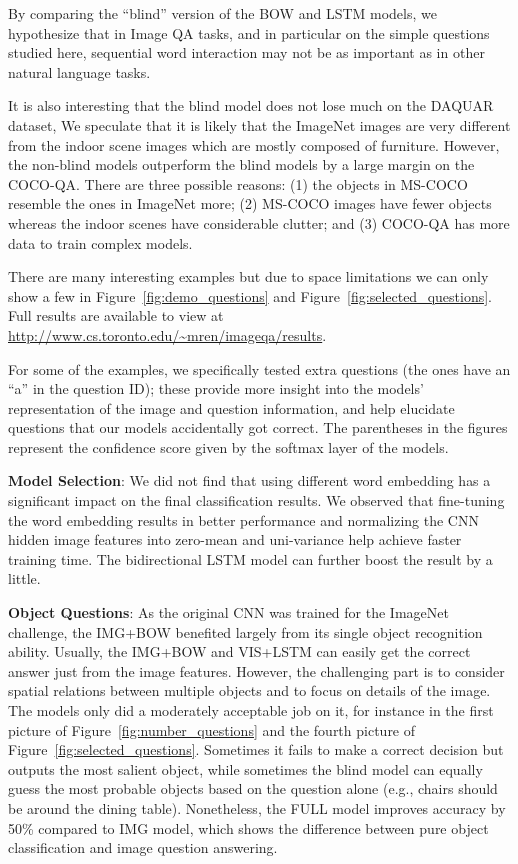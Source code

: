 \documentclass{article} %
\renewcommand{\#}[1]{\textbf{#1}}
\begin{document}
By comparing the “blind” version of the BOW and LSTM models, we hypothesize
that in Image QA tasks, and in particular on the simple questions studied here,
sequential word interaction may not be as important as in other natural
language tasks. 

It is also interesting that the blind model does not lose much on the DAQUAR
dataset, We speculate that it is likely that the ImageNet images are very
different from the indoor scene images which are mostly composed of furniture.
However, the non-blind models outperform the blind models by a large margin on
the COCO-QA. There are three possible reasons: (1) the objects in MS-COCO
resemble the ones in ImageNet more; (2) MS-COCO images have fewer objects
whereas the indoor scenes have considerable clutter; and (3) COCO-QA has more
data to train complex models.

There are many interesting examples but due to space limitations we can only
show a few in Figure~\ref{fig:demo_questions} and
Figure~\ref{fig:selected_questions}. Full results are available to view at
\url{http://www.cs.toronto.edu/~mren/imageqa/results}.

For some of the examples, we specifically tested extra questions (the ones have
an ``a'' in the question ID); these provide more insight into the models'
representation of the image and question information, and help elucidate
questions that our models accidentally got correct. The parentheses in the
figures represent the confidence score given by the softmax layer of the
models.

\textbf{Model Selection}: We did not find that using different word embedding
has a significant impact on the final classification results. We observed that
fine-tuning the word embedding results in better performance and normalizing
the CNN hidden image features into zero-mean and uni-variance help achieve
faster training time. The bidirectional LSTM model can further boost the result
by a little.
 
\textbf{Object Questions}: As the original CNN was trained for the ImageNet
challenge, the IMG+BOW benefited largely from its single object recognition
ability. Usually, the IMG+BOW and VIS+LSTM can easily get the correct answer
just from the image features. However, the challenging part is to consider
spatial relations between multiple objects and to focus on details of the
image. The models only did a moderately acceptable job on it, for instance in
the first picture of Figure~\ref{fig:number_questions} and the fourth picture of Figure~\ref{fig:selected_questions}. Sometimes it fails
to make a correct decision but outputs the most salient object, while sometimes
the blind model can equally guess the most probable objects based on the
question alone (e.g., chairs should be around the dining table). Nonetheless,
the FULL model improves accuracy by 50\% compared to IMG model, which shows the
difference between pure object classification and image question answering.
\end{document}
